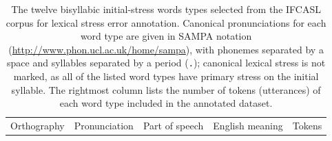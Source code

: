 	\begin{table}[htb]
		\centering
		\caption[Word types annotated for lexical stress errors]{The twelve bisyllabic initial-stress words types selected from the IFCASL corpus for lexical stress error annotation. 
		Canonical pronunciations for each word type are given in SAMPA notation (\url{http://www.phon.ucl.ac.uk/home/sampa}), with phonemes separated by a space and syllables separated by a period (\texttt{.}); canonical lexical stress is not marked, as all of the listed word types have primary stress on the initial syllable. 
		The rightmost column lists the number of tokens (utterances) of each word type included in the annotated dataset.
		}
		
		\begin{tabular}{llllc}
		\toprule
		
		Orthography & 
		Pronunciation & 
		Part of speech & 
		English meaning & 
		Tokens\\%
		

\end{tabular}
\end{table}
